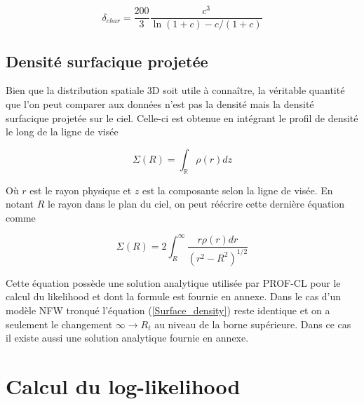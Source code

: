 \documentclass[a4paper,11pt]{article}
\numberwithin{equation}{section}
\begin{document}
\begin{multicols}{2}
    \begin{equation}
      \delta_{char} = \frac{200}{3} \frac{c^3}{\ln(1+c) - c / (1+c)}
    \end{equation}
    
  \subsection{Densité surfacique projetée}
    Bien que la distribution spatiale 3D soit utile à connaître, la véritable quantité que l'on peut comparer aux données n'est pas la densité mais la densité surfacique projetée sur le ciel. Celle-ci est obtenue en intégrant le profil de densité le long de la ligne de visée
    
    \begin{equation}
      \Sigma (R) = \int_{\mathbb{R}} \rho (r) dz
    \end{equation}
    
    Où $r$ est le rayon physique et $z$ est la composante selon la ligne de visée. En notant $R$ le rayon dans le plan du ciel, on peut réécrire cette dernière équation comme
    
    \begin{equation}
      \label{Surface_density}
      \Sigma(R) = 2 \int _{R}^{\infty} \frac{r \rho (r) dr}{(r^2 - R^2)^{1/2}} 
    \end{equation}
    
    Cette équation possède une solution analytique utilisée par PROF-CL pour le calcul du likelihood et dont la formule est fournie en annexe. Dans le cas d'un modèle NFW tronqué l'équation (\ref{Surface_density}) reste identique et on a seulement le changement $\infty \rightarrow R_t$ au niveau de la borne supérieure. Dans ce cas il existe aussi une solution analytique fournie en annexe.

  \newpage
  \section{Calcul du log-likelihood}

\end{multicols}
\end{document}
